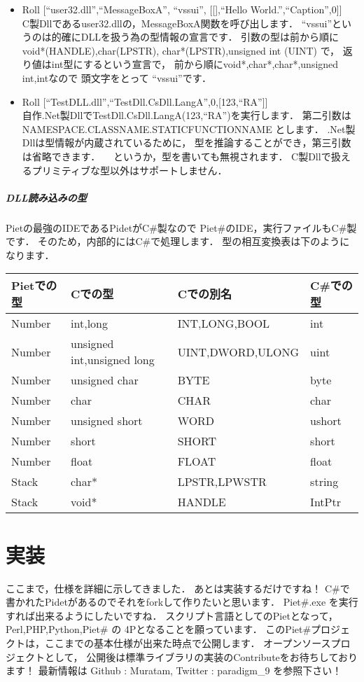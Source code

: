 \begin{itemize}
\item
  Roll {[}``user32.dll'',``MessageBoxA'', ``vssui'', {[}{[}{]},``Hello
  World.'',``Caption'',0{]}{]}\\C製Dllであるuser32.dllの，MessageBoxA関数を呼び出します．
  ``vssui''というのは的確にDLLを扱う為の型情報の宣言です．
  引数の型は前から順に void*(HANDLE),char(LPSTR),
  char*(LPSTR),unsigned int (UINT) で，
  返り値はint型にするという宣言で，
  前から順にvoid*,char*,char*,unsigned int,intなので 頭文字をとって
  ``vssui''です．
\item
  Roll
  {[}``TestDLL.dll'',``TestDll.CsDll.LangA'',0,{[}123,``RA''{]}{]}\\自作.Net製DllでTestDll.CsDll.LangA(123,``RA'')を実行します．
  第二引数は NAMESPACE.CLASSNAME.STATICFUNCTIONNAME とします．
  .Net製Dllは型情報が内蔵されているために，
  型を推論することができ，第三引数は省略できます．
  　というか，型を書いても無視されます．
  C製Dllで扱えるプリミティブな型以外はサポートしません．
\end{itemize}

\subparagraph{DLL読み込みの型}

Pietの最強のIDEであるPidetがC\#製なので
Piet\#のIDE，実行ファイルもC\#製です． そのため，内部的にはC\#で処理します．
型の相互変換表は下のようになります．

\begin{table}[htb]
    \begin{tabular}{llll}
      Pietでの型 & Cでの型 & Cでの別名 & C\#での型 \\ \hline \hline
      Number & int,long & INT,LONG,BOOL & int \\
      Number & unsigned int,unsigned long & UINT,DWORD,ULONG & uint \\
      Number & unsigned char & BYTE & byte \\
      Number & char & CHAR &char \\
      Number & unsigned short & WORD &ushort \\
      Number & short & SHORT & short \\
      Number & float & FLOAT & float \\
      Stack & char* & LPSTR,LPWSTR & string \\
      Stack & void* & HANDLE & IntPtr
    \end{tabular}
\end{table}

\section{実装}

ここまで，仕様を詳細に示してきました． あとは実装するだけですね！
C\#で書かれたPidetがあるのでそれをforkして作りたいと思います． Piet\#.exe
を実行すれば出来るようにしたいですね．
スクリプト言語としてのPietとなって， Perl,PHP,Python,Piet\# の
4Pとなることを願っています．
このPiet\#プロジェクトは，ここまでの基本仕様が出来た時点で公開します．
オープンソースプロジェクトとして，
公開後は標準ライブラリの実装のContributeをお待ちしております！ 最新情報は
Github : Muratam, Twitter : paradigm\_9 を参照下さい！
